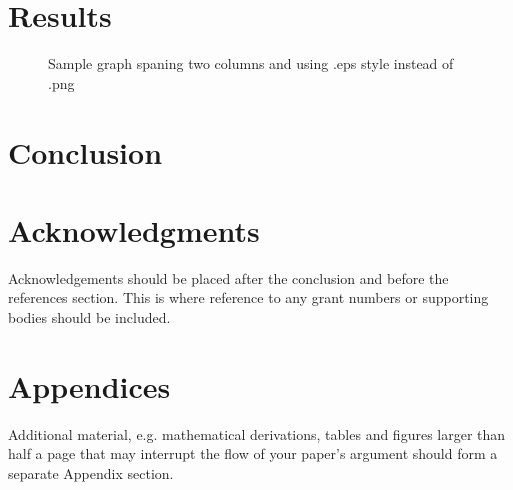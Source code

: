 \documentclass{psig_required_latex_files/psig}
\begin{document}
\section{Results}\label{sec3}
\lipsum[7-8]

\begin{figure}[!b]
\caption{Sample graph spaning two columns and using .eps style instead of .png}\label{fig2}
\end{figure}


\section{Conclusion}\label{sec4}
\lipsum[10]


\section*{Acknowledgments}\label{sec11}

Acknowledgements should be placed after the conclusion and before the
references section. This is where reference to any grant numbers or
supporting bodies should be included. 






\section*{Appendices}\label{sec:app}

Additional material, e.g. mathematical derivations, tables and figures
larger than half a page that may interrupt the flow of your paper's argument
should form a separate Appendix section.
\end{document}
